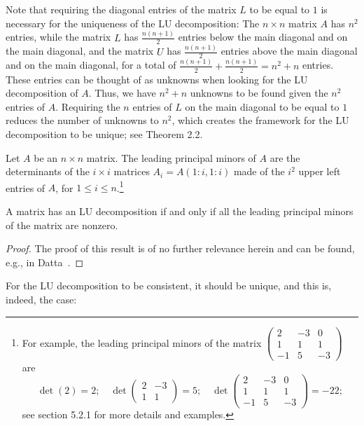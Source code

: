 Note that requiring the diagonal entries of the matrix $L$ to be equal
to $1$ is necessary for the uniqueness of the LU decomposition: The
$n\times n$ matrix $A$ has $n^2$ entries, while the matrix $L$ has
$\frac{n(n+1)}{2}$ entries below the main diagonal and on the main
diagonal, and the matrix $U$ has $\frac{n(n+1)}{2}$ entries above the
main diagonal and on the main diagonal, for a total of
$\frac{n(n+1)}{2}+\frac{n(n+1)}{2} = n^2+n$ entries. These entries can be
thought of as unknowns when looking for the LU decomposition of $A$.
Thus, we have $n^2+n$ unknowns to be found given the $n^2$ entries of
$A$. Requiring the $n$ entries of $L$ on the main diagonal to be equal
to $1$ reduces the number of unknowns to $n^2$, which creates the
framework for the LU decomposition to be unique; see Theorem 2.2.

\begin{definition}
Let $A$ be an $n\times n$ matrix. The leading principal minors of $A$
are the determinants of the $i\times i$ matrices $A_i = A(1:i,1:i)$ made
of the $i^2$ upper left entries of $A$, for $1\le i\le
n$.\footnote{For example, the leading principal minors of the matrix
$\begin{pmatrix} 2 & -3 & 0\\ 1 & 1 & 1\\ -1 & 5 & -3\end{pmatrix}$ are
\[
\det(2) = 2; \quad
\det\begin{pmatrix} 2 & -3\\ 1 & 1\end{pmatrix} = 5; \quad
\det\begin{pmatrix} 2 & -3 & 0\\ 1 & 1 & 1\\ -1 & 5 & -3\end{pmatrix} = -22;
\]
see section 5.2.1 for more details and examples.}
\end{definition}

\begin{theorem}
A matrix has an LU decomposition if and only if all the leading
principal minors of the matrix are nonzero.
\end{theorem}

\begin{proof}
The proof of this result is of no further relevance herein and can be
found, e.g., in Datta~\cite{12}.
\end{proof}

For the LU decomposition to be consistent, it should be unique, and this
is, indeed, the case:

